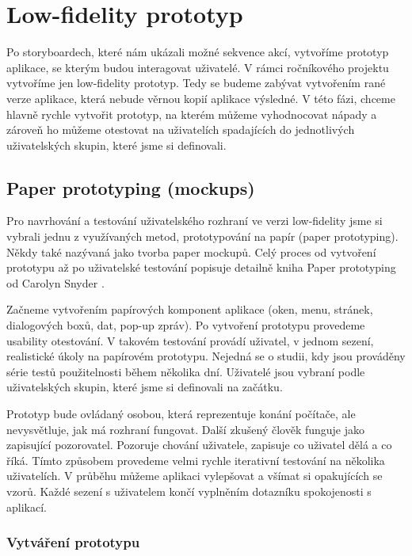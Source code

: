\chapter{Low-fidelity prototyp}

Po storyboardech, které nám ukázali možné sekvence akcí, vytvoříme prototyp aplikace, se kterým budou interagovat uživatelé. V rámci ročníkového projektu vytvoříme jen low-fidelity prototyp. Tedy se budeme zabývat vytvořením rané verze aplikace, která nebude věrnou kopií aplikace výsledné. V této fázi, chceme hlavně rychle vytvořit prototyp, na kterém můžeme vyhodnocovat nápady a zároveň ho můžeme otestovat na uživatelích spadajících do jednotlivých uživatelských skupin, které jsme si definovali.

\section{Paper prototyping (mockups)}

Pro navrhování a testování uživatelského rozhraní ve verzi low-fidelity jsme si vybrali jednu z využívaných metod, prototypování na papír (paper prototyping). Někdy také nazývaná jako tvorba paper mockupů. Celý proces od vytvoření prototypu až po uživatelské testování popisuje detailně kniha Paper prototyping od Carolyn Snyder \cite{Paper_Prototyping}.

Začneme vytvořením papírových komponent aplikace (oken, menu, stránek, dialogových boxů, dat, pop-up zpráv). 
Po vytvoření prototypu provedeme usability otestování.
V takovém testování provádí uživatel, v jednom sezení, realistické úkoly na papírovém prototypu. Nejedná se o studii, kdy jsou prováděny série testů použitelnosti během několika dní. Uživatelé jsou vybraní podle uživatelských skupin, které jsme si definovali na začátku.

Prototyp bude ovládaný osobou, která reprezentuje konání počítače, ale nevysvětluje, jak má rozhraní fungovat. Další zkušený člověk funguje jako zapisující pozorovatel. Pozoruje chování uživatele, zapisuje co uživatel dělá a co říká. Tímto způsobem provedeme velmi rychle iterativní testování na několika uživatelích. V průběhu můžeme aplikaci vylepšovat a všímat si opakujících se vzorů. Každé sezení s uživatelem končí vyplněním dotazníku spokojenosti s aplikací.

\subsection{Vytváření prototypu}

